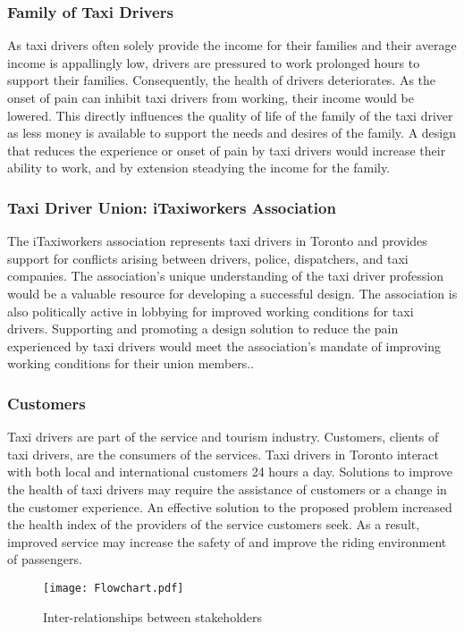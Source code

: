 \documentclass[11pt]{article}
\begin{document}
\subsubsection{Family of Taxi Drivers}
As taxi drivers often solely provide the 
income for their families and their average income is appallingly low, drivers are pressured to work prolonged hours to support their families. Consequently, the health of drivers deteriorates. 
As the onset of pain can inhibit taxi drivers from working, their income would be lowered. This directly influences 
the quality of life of the family of the taxi driver as less money is available to support the needs and desires of the family. A design that
reduces the experience or onset of pain by taxi drivers would increase their ability 
to work, and by extension steadying the income for the family. 


\subsubsection{Taxi Driver Union: iTaxiworkers Association}
The iTaxiworkers association represents taxi drivers in Toronto and 
provides support for conflicts arising between drivers, police, dispatchers, and 
taxi companies. The association’s unique understanding of the taxi driver 
profession would be a valuable resource for developing a successful design.
The association is also politically active in lobbying for improved working 
conditions for taxi drivers. Supporting and promoting a design solution to 
reduce the pain experienced by taxi drivers would meet the association’s mandate 
of improving working conditions for their union members.\cite{itaxi}. 

\subsubsection{Customers}
Taxi drivers are part of the service and tourism industry. Customers,
clients of taxi drivers, are the consumers of the services. Taxi 
drivers in Toronto interact with both local and international customers 
24 hours a day. Solutions to improve the health of taxi drivers 
may require the assistance of customers or a change in the customer 
experience. An effective solution to the proposed problem increased 
the health index of the providers of the service customers seek. As a 
result, improved service may increase the safety of and improve the 
riding environment of passengers.

 
\begin{figure}
  \centering
  \texttt{[image: Flowchart.pdf]}
  \caption{Inter-relationships between stakeholders}
\end{figure}
\end{document}
